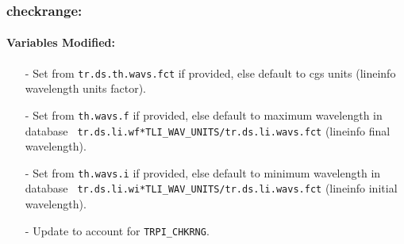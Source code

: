 \documentclass[letterpaper,12pt]{article}
\begin{document}
\subsubsection{checkrange:}
\paragraph{Variables Modified:}
\begin{enumerate}[leftmargin=10pt, noitemsep, parsep=0pt, topsep=0ex]
\item[-] Set  from {\tt tr.ds.th.wavs.fct} if
  provided, else default to cgs units (lineinfo wavelength units
  factor).
\item[-] Set  from {\tt th.wavs.f} if
  provided, else default to maximum wavelength in database {\tt
    tr.ds.li.wf*TLI\_WAV\_UNITS/tr.ds.li.wavs.fct} (lineinfo final
  wavelength).
\item[-] Set  from {\tt th.wavs.i} if
  provided, else default to minimum wavelength in database {\tt
    tr.ds.li.wi*TLI\_WAV\_UNITS/tr.ds.li.wavs.fct} (lineinfo initial
  wavelength).
\item[-] Update  to account for {\tt TRPI\_CHKRNG}.
\end{enumerate}
\end{document}
